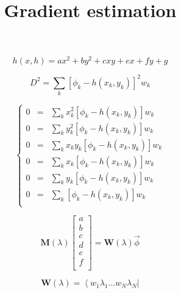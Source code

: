 \documentclass[aps,12pt]{revtex4}
\begin{document}
\title{Gradient estimation}
\maketitle

\begin{equation}
h(x,h) = a x^2+b y^2 + c xy + e x + f y + g
\end{equation}

\begin{equation}
	D^2 = \sum_k \left[ \phi_k - h(x_k,y_k)\right]^2 w_k
\end{equation}

\begin{equation}
\left\lbrace
\begin{array}{rcl}
0 & = & \displaystyle \sum_k x_k^2 \left[ \phi_k - h(x_k,y_k)\right] w_k \\
0 & = & \displaystyle \sum_k y_k^2 \left[ \phi_k - h(x_k,y_k)\right] w_k \\
0 & = & \displaystyle \sum_k x_k y_k \left[ \phi_k - h(x_k,y_k)\right] w_k \\
0 & = & \displaystyle \sum_k x_k  \left[ \phi_k - h(x_k,y_k)\right] w_k \\
0 & = & \displaystyle \sum_k y_k \left[ \phi_k - h(x_k,y_k)\right] w_k \\
0 & = & \displaystyle \sum_k \left[ \phi_k - h(x_k,y_k)\right] w_k \\
\end{array}
\right.
\end{equation}

\begin{equation}
	\bm{M}(\lambda)
	\begin{bmatrix}
	a\\
	b\\
	c\\
	d\\
	e\\
	f\\
	\end{bmatrix}
	= 
	\bm{W}(\lambda) \vec{\phi}
\end{equation}

\begin{equation}
\bm{W}(\lambda) = \left< w_1 \lambda_1 \ldots w_N \lambda_N \right|
\end{equation}
\end{document}
